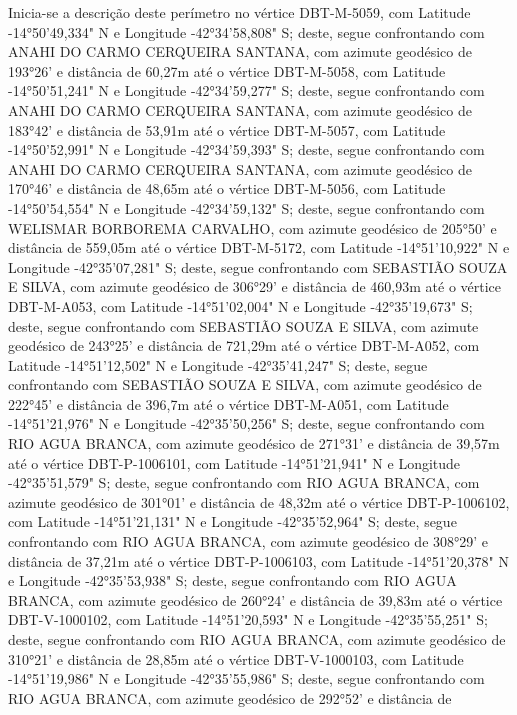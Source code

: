 Inicia-se a descrição deste perímetro no vértice DBT-M-5059, com Latitude -14°50'49,334" N e Longitude -42°34'58,808" S; deste, segue confrontando com ANAHI DO CARMO CERQUEIRA SANTANA, com azimute geodésico de 193°26' e distância de 60,27m até o vértice DBT-M-5058, com Latitude -14°50'51,241" N e Longitude -42°34'59,277" S; deste, segue confrontando com ANAHI DO CARMO CERQUEIRA SANTANA, com azimute geodésico de 183°42' e distância de 
53,91m  até o vértice DBT-M-5057, com Latitude -14°50'52,991" N e Longitude -42°34'59,393" S; deste, segue confrontando com ANAHI DO CARMO CERQUEIRA SANTANA, com azimute geodésico de 170°46' e distância de 
48,65m  até o vértice DBT-M-5056, com Latitude -14°50'54,554" N e Longitude -42°34'59,132" S; deste, segue confrontando com WELISMAR BORBOREMA CARVALHO, com azimute geodésico de 205°50' e distância de 
559,05m  até o vértice DBT-M-5172, com Latitude -14°51'10,922" N e Longitude -42°35'07,281" S; deste, segue confrontando com SEBASTIÃO SOUZA E SILVA, com azimute geodésico de 306°29' e distância de 
460,93m  até o vértice DBT-M-A053, com Latitude -14°51'02,004" N e Longitude -42°35'19,673" S; deste, segue confrontando com SEBASTIÃO SOUZA E SILVA, com azimute geodésico de 243°25' e distância de 
721,29m  até o vértice DBT-M-A052, com Latitude -14°51'12,502" N e Longitude -42°35'41,247" S; deste, segue confrontando com SEBASTIÃO SOUZA E SILVA, com azimute geodésico de 222°45' e distância de 
396,7m  até o vértice DBT-M-A051, com Latitude -14°51'21,976" N e Longitude -42°35'50,256" S; deste, segue confrontando com RIO AGUA BRANCA, com azimute geodésico de 271°31' e distância de 
39,57m  até o vértice DBT-P-1006101, com Latitude -14°51'21,941" N e Longitude -42°35'51,579" S; deste, segue confrontando com RIO AGUA BRANCA, com azimute geodésico de 301°01' e distância de 
48,32m  até o vértice DBT-P-1006102, com Latitude -14°51'21,131" N e Longitude -42°35'52,964" S; deste, segue confrontando com RIO AGUA BRANCA, com azimute geodésico de 308°29' e distância de 
37,21m  até o vértice DBT-P-1006103, com Latitude -14°51'20,378" N e Longitude -42°35'53,938" S; deste, segue confrontando com RIO AGUA BRANCA, com azimute geodésico de 260°24' e distância de 
39,83m  até o vértice DBT-V-1000102, com Latitude -14°51'20,593" N e Longitude -42°35'55,251" S; deste, segue confrontando com RIO AGUA BRANCA, com azimute geodésico de 310°21' e distância de 
28,85m  até o vértice DBT-V-1000103, com Latitude -14°51'19,986" N e Longitude -42°35'55,986" S; deste, segue confrontando com RIO AGUA BRANCA, com azimute geodésico de 292°52' e distância de 
